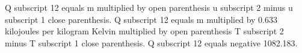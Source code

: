 Q subscript 12 equals m multiplied by open parenthesis u subscript 2 minus u subscript 1 close parenthesis.  
Q subscript 12 equals m multiplied by 0.633 kilojoules per kilogram Kelvin multiplied by open parenthesis T subscript 2 minus T subscript 1 close parenthesis.  
Q subscript 12 equals negative 1082.183.
